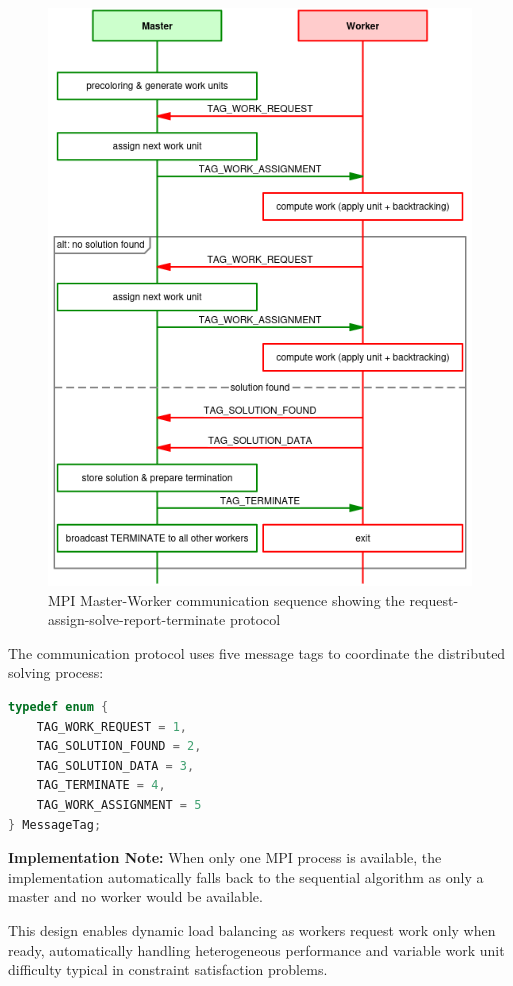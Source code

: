 \begin{figure}[htbp]
\centering
\includegraphics[width=0.9\linewidth]{imgs/mpi_msc.png}
\caption{MPI Master-Worker communication sequence showing the request-assign-solve-report-terminate protocol}
\label{fig:mpi_sequence}
\end{figure}

The communication protocol uses five message tags to coordinate the distributed solving process:

\begin{lstlisting}[language=C, caption=MPI communication protocol, label={listing:mpi_tags}]
typedef enum {
    TAG_WORK_REQUEST = 1,
    TAG_SOLUTION_FOUND = 2,
    TAG_SOLUTION_DATA = 3,
    TAG_TERMINATE = 4,
    TAG_WORK_ASSIGNMENT = 5
} MessageTag;
\end{lstlisting}

\textbf{Implementation Note:} When only one MPI process is available, the implementation automatically falls back to the sequential algorithm as only a master and no worker would be available.

This design enables dynamic load balancing as workers request work only when ready, automatically handling heterogeneous performance and variable work unit difficulty typical in constraint satisfaction problems.


